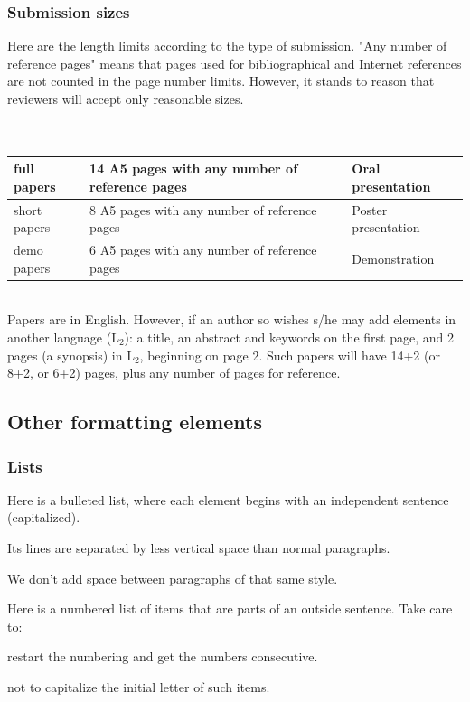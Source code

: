 \documentclass[10pt,a5paper,twoside]{article}
\begin{document}
\subsubsection{Submission sizes}
Here are the length limits according to the type of submission. "Any number of reference pages" means that pages used for bibliographical and Internet references are not counted in the page number limits. However, it stands to reason that reviewers will accept only reasonable sizes.\\\\\\
\begin{tabular}{|l|l|l|}
\hline
full papers & 14 A5 pages with any number of reference pages & Oral presentation\\
\hline
short papers & 8 A5 pages with any number of reference pages & Poster presentation\\
\hline
demo papers & 6 A5 pages with any number of reference pages & Demonstration\\
\hline
\end{tabular}\\

Papers are in English. However, if an author so wishes s/he may add elements in another language (L$_{2}$): a title, an abstract and keywords on the first page, and 2 pages (a synopsis) in L$_{2}$, beginning on page 2. Such papers will have 14+2 (or 8+2, or 6+2) pages, plus any number of pages for reference. 
\subsection{Other formatting elements}
\subsubsection{Lists}
Here is a bulleted list, where each element begins with an independent sentence (capitalized).
\begin{compactitem}
\item Its lines are separated by less vertical space than normal paragraphs.
\item We don’t add space between paragraphs of that same style.
\end{compactitem}

Here is a numbered list of items that are parts of an outside sentence. Take care to:
\begin{compactenum}
\item restart the numbering and get the numbers consecutive. 
\item not to capitalize the initial letter of such items.
\end{compactenum}
\end{document}
